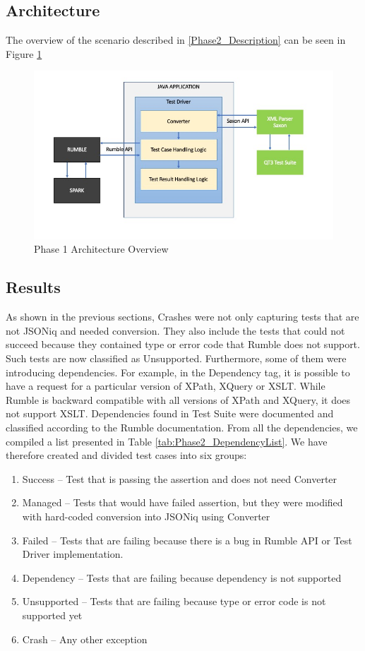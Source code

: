 \subsection{Architecture}
The overview of the scenario described in \ref{Phase2_Description} can be seen in Figure \ref{fig:Phase2_Architecture}
\begin{figure}[h!]
	\vspace*{-5mm}
	\includegraphics[width=\linewidth]{architecture_diagram_phase_2.jpg}
	\vspace*{-15mm}
	\caption{Phase 1 Architecture Overview}
	\label{fig:Phase2_Architecture}
\end{figure}

\subsection{Results}
\label{Phase2_Results}
As shown in the previous sections, Crashes were not only capturing tests that are not JSONiq and needed conversion. They also include the tests that could not succeed because they contained type or error code that Rumble does not support. Such tests are now classified as Unsupported. Furthermore, some of them were introducing dependencies. For example, in the Dependency tag, it is possible to have a request for a particular version of XPath, XQuery or XSLT. While Rumble is backward compatible with all versions of XPath and XQuery, it does not support XSLT. Dependencies found in Test Suite were documented and classified according to the Rumble documentation. From all the dependencies, we compiled a list presented in Table \ref{tab:Phase2_DependencyList}. We have therefore created and divided test cases into six groups:
\begin{enumerate}
	\item Success – Test that is passing the assertion and does not need Converter
	\item Managed – Tests that would have failed assertion, but they were modified with hard-coded conversion into JSONiq using Converter
	\item Failed – Tests that are failing because there is a bug in Rumble API or Test Driver implementation. 
	\item Dependency – Tests that are failing because dependency is not supported
	\item Unsupported – Tests that are failing because type or error code is not supported yet
	\item Crash – Any other exception
\end{enumerate}

